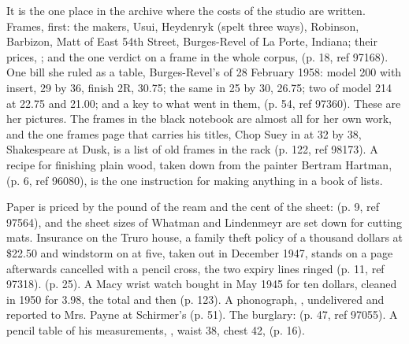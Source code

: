 It is the one place in the archive where the costs of the studio are written. Frames, first: the makers, Usui, Heydenryk (spelt three ways), Robinson, Barbizon, Matt of East 54th Street, Burges-Revel of La Porte, Indiana; their prices, ; and the one verdict on a frame in the whole corpus,  (p. 18, ref 97168). One bill she ruled as a table, Burges-Revel's of 28 February 1958: model 200 with insert, 29 by 36, finish 2R, 30.75; the same in 25 by 30, 26.75; two of model 214 at 22.75 and 21.00; and a key to what went in them,  (p. 54, ref 97360). These are her pictures. The frames in the black notebook are almost all for her own work, and the one frames page that carries his titles, Chop Suey in  at 32 by 38, Shakespeare at Dusk, is a list of old frames in the rack (p. 122, ref 98173). A recipe for finishing plain wood, taken down from the painter Bertram Hartman,  (p. 6, ref 96080), is the one instruction for making anything in a book of lists.

Paper is priced by the pound of the ream and the cent of the sheet:  (p. 9, ref 97564), and the sheet sizes of Whatman and Lindenmeyr are set down for cutting mats. Insurance on the Truro house, a family theft policy of a thousand dollars at \$22.50 and windstorm on  at five, taken out in December 1947, stands on a page afterwards cancelled with a pencil cross, the two expiry lines ringed (p. 11, ref 97318).  (p. 25). A Macy wrist watch bought in May 1945 for ten dollars, cleaned in 1950 for 3.98, the total  and then  (p. 123). A phonograph, , undelivered and reported to Mrs. Payne at Schirmer's (p. 51). The burglary:  (p. 47, ref 97055). A pencil table of his measurements, , waist 38, chest 42,  (p. 16).

